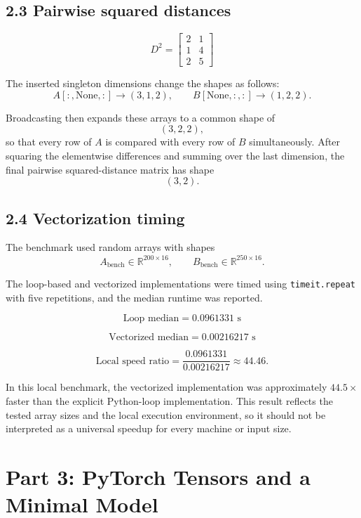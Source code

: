 \documentclass[11pt]{article}
\begin{document}
\subsection*{2.3 Pairwise squared distances}

\[
D^2 =
\begin{bmatrix}
2 & 1 \\
1 & 4 \\
2 & 5
\end{bmatrix}
\]

The inserted singleton dimensions change the shapes as follows:
\[
A[:, \text{None}, :] \rightarrow (3,1,2),
\qquad
B[\text{None}, :, :] \rightarrow (1,2,2).
\]

Broadcasting then expands these arrays to a common shape of
\[
(3,2,2),
\]
so that every row of \(A\) is compared with every row of \(B\) simultaneously.
After squaring the elementwise differences and summing over the last dimension,
the final pairwise squared-distance matrix has shape
\[
(3,2).
\]

\subsection*{2.4 Vectorization timing}
The benchmark used random arrays with shapes
\[
A_{\text{bench}} \in \mathbb{R}^{200 \times 16},
\qquad
B_{\text{bench}} \in \mathbb{R}^{250 \times 16}.
\]

The loop-based and vectorized implementations were timed using
\texttt{timeit.repeat} with five repetitions, and the median runtime was reported.

\[
\text{Loop median} = 0.0961331 \text{ s}
\]

\[
\text{Vectorized median} = 0.00216217 \text{ s}
\]

\[
\text{Local speed ratio}
=
\frac{0.0961331}{0.00216217}
\approx 44.46.
\]

In this local benchmark, the vectorized implementation was approximately
\(44.5\times\) faster than the explicit Python-loop implementation.
This result reflects the tested array sizes and the local execution environment,
so it should not be interpreted as a universal speedup for every machine or input size.
\section*{Part 3: PyTorch Tensors and a Minimal Model}
\end{document}
